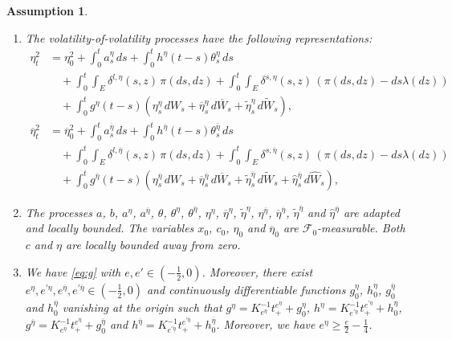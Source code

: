 \documentclass[ecta,nameyear,draft]{econsocart}
\newtheorem{Assumption}{Assumption}
\def\wt{\widetilde}
\def\wh{\widehat}
\newcommand{\1}{\mathbf 1}
\newcommand{\bfeta}{{\boldsymbol{\eta}}}
\newcommand{\calF}{\mathcal{F}}
\newcommand{\jump}{\delta}
\numberwithin{equation}{section}
\newcommand{\la}{{\lambda}}
\newcommand{\ov}{\overline}
\begin{document}
\begin{appendix}
\begin{Assumption}
\begin{enumerate}
		\item[(i)] The volatility-of-volatility processes have the following representations:
		\begin{equation}			\label{eq:def:etai}
			\begin{split}
			\eta_t^2 &= \eta_0^2 + \int_0^t a^{\eta}_s \, ds + \int_0^t h^{\eta}(t-s) \theta_s^{\eta} \, ds \\
			&\quad +   \int_0^t \int_E \jump^{l,\eta}(s,z)\,\pi(ds, dz)+ \int_0^t \int_E \jump^{s,\eta}(s,z) \, (\pi(ds, dz)-ds\la(dz))\\
			&\quad+ \int_0^t g^{\eta}(t-s) (\eta^{\eta}_s \, dW_s+ \ov\eta^{\eta}_s \,d\ov W_s + \wt \eta^{\eta}_s\, d\wt W_s),\\
			\ov\eta_t^{2} &= \ov\eta_0^{2} + \int_0^t a^{\ov\eta}_s \, ds + \int_0^t   h^{\ov\eta}(t-s) \theta_s^{\ov\eta} \, ds\\
			&\quad + \int_0^t \int_E \jump^{l,\ov \eta}(s,z)\,\pi(ds, dz)+ \int_0^t \int_E \jump^{s,\ov \eta}(s,z) \, (\pi(ds, dz)-ds\la(dz))\\
			&\quad+ \int_0^t g^{\ov\eta}(t-s) (\eta^{\ov \eta}_s \, dW_s+ \ov\eta^{\ov\eta}_s \,d\ov W_s + \wt \eta^{\ov \eta}_s \,d\wt W_s+\wh\eta^{\ov\eta}_s \,d\wh W_s),
			\end{split}
		\end{equation}
		\item[(ii)] The processes $a$, $b$, $a^\eta$, $a^{\ov \eta}$, $\theta$, $\theta^\eta$, $\theta^{\ov \eta}$, $\eta^\eta$, $\ov\eta^\eta$, $\wt\eta^\eta$, $\eta^{\ov \eta}$, $\ov\eta^{\ov \eta}$, $\wt\eta^{\ov \eta}$ and $\wh\eta^{\ov \eta}$ are adapted and locally bounded. The variables $x_0$, $c_0$, $\eta_0$ and $\ov \eta_0$ are $\calF_0$-measurable. Both $c$ and $\eta$ are locally bounded away from zero. 
		
		\item[(iii)] We have \eqref{eq:g} with $e,e'\in (-\frac12,0)$. Moreover,  there exist $e^\eta,e^{\prime \eta}, e^{\ov \eta}, e^{\prime \ov \eta} \in(-\frac12,0)$ and continuously differentiable functions $g^\eta_0$, $h^\eta_0$, $g^{\ov\eta}_0$ and $h^{\ov \eta}_0$ vanishing at the origin such that $g^\eta = K_{e^\eta}^{-1} t_+^{e^\eta}+ g^\eta_0$, $h^\eta = K_{e^{\prime\eta}}^{-1} t_+^{e^{\prime\eta}}+ h^\eta_0$, $g^{\ov\eta} = K_{e^{\ov\eta}}^{-1} t_+^{e^{\ov\eta}}+ g^{\ov\eta}_0$ and $h^{\ov\eta} = K_{e^{\prime\ov\eta}}^{-1} t_+^{e^{\prime \ov\eta}}+ h^{\ov\eta}_0$.
		Moreover, we have $e^\eta \geq \frac{e}{2}-\frac14$.
		

\end{enumerate}
\end{Assumption}
\end{appendix}
\end{document}
